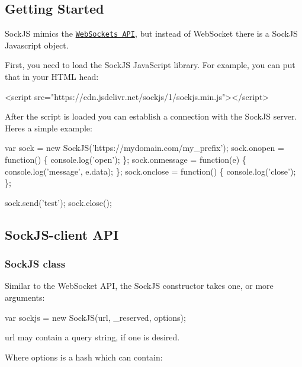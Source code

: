 \subsection*{Getting Started }

Sock\+JS mimics the \href{https://www.w3.org/TR/websockets/}{\tt Web\+Sockets A\+PI}, but instead of {\ttfamily Web\+Socket} there is a {\ttfamily Sock\+JS} Javascript object.

First, you need to load the Sock\+JS Java\+Script library. For example, you can put that in your H\+T\+ML head\+:


\begin{DoxyCode}
<script src="https://cdn.jsdelivr.net/sockjs/1/sockjs.min.js"></script>
\end{DoxyCode}


After the script is loaded you can establish a connection with the Sock\+JS server. Here\textquotesingle{}s a simple example\+:


\begin{DoxyCode}
var sock = new SockJS('https://mydomain.com/my\_prefix');
sock.onopen = function() \{
    console.log('open');
\};
sock.onmessage = function(e) \{
    console.log('message', e.data);
\};
sock.onclose = function() \{
    console.log('close');
\};

sock.send('test');
sock.close();
\end{DoxyCode}


\subsection*{Sock\+J\+S-\/client A\+PI }

\subsubsection*{Sock\+JS class}

Similar to the \textquotesingle{}Web\+Socket\textquotesingle{} A\+PI, the \textquotesingle{}Sock\+JS\textquotesingle{} constructor takes one, or more arguments\+:


\begin{DoxyCode}
var sockjs = new SockJS(url, \_reserved, options);
\end{DoxyCode}


{\ttfamily url} may contain a query string, if one is desired.

Where {\ttfamily options} is a hash which can contain\+:


